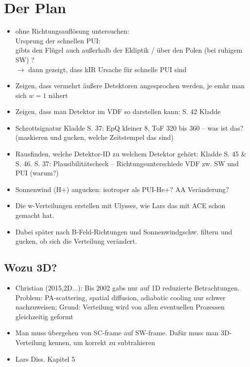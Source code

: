 \documentclass[]{article}
\begin{document}
\section{Der Plan}
	\begin{itemize}
		\item ohne Richtungsauflösung untersuchen: \\
			Ursprung der schnellen PUI: \\
			gibts den Flügel auch außerhalb der Ekliptik / über den Polen (bei ruhigem SW) ?\\
			$\rightarrow$ dann gezeigt, dass kIR Ursache für schnelle PUI sind
		\item Zeigen, dass vermehrt äußere Detektoren angesprochen werden, je emhr man sich $w = 1$ nähert
		\item Zeigen, dass man Detektor im VDF so darstellen kann: S. 42 Kladde
		\item Schrottsignatur Kladde S. 37: EpQ kleiner 8, ToF 320 bis 360 -- was ist das? (maskieren und gucken, welche Zeitstempel das sind)
		\item Rausfinden, welche Detektor-ID zu welchem Detektor gehört: Kladde S. 45 \& S. 46. S. 37: Plausibilitätscheck -- Richtungsunterschiede VDF zw. SW und PUI (warum?)
		\item Sonnenwind (H+) angucken: isotroper als PUI-He+? AA Veränderung?
		\item Die w-Verteilungen erstellen mit Ulysses, wie Lars das mit ACE schon gemacht hat.
		\item Dabei später nach B-Feld-Richtungen und Sonnenwindgschw. filtern und gucken, ob sich die Verteilung verändert. 
	\end{itemize}
\subsection{Wozu 3D?}
\begin{itemize}
	\item Christian (2015,2D...): Bis 2002 gabs nur auf 1D reduzierte Betrachtungen. Problem: PA-scattering, spatial diffusion, adiabatic cooling nur schwer nachzuweisen; Grund: Verteilung wird von allen eventuellen Prozessen gleichzeitig geformt
	\item Man muss übergehen von SC-frame auf SW-frame. Dafür muss man 3D-Verteilung kennen, um korrekt zu subtrahieren
	\item Lars Diss. Kapitel 5
\end{itemize}
%
\end{document}
